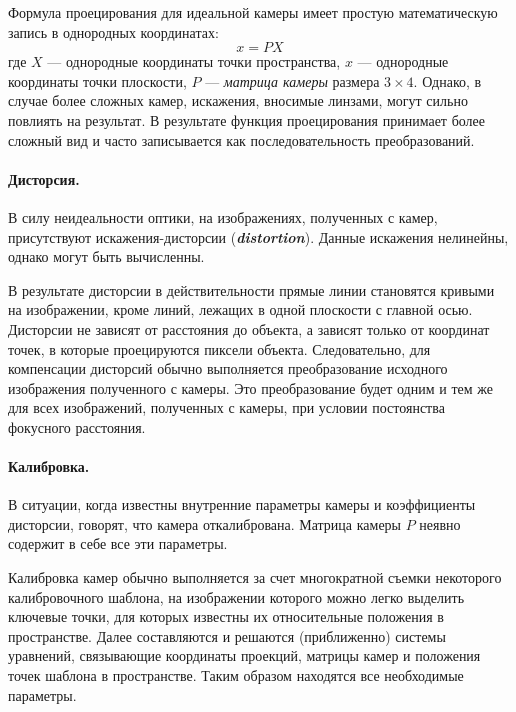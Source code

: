 \documentclass[oneside,final,12pt]{scrartcl}
\begin{document}
			Формула проецирования для идеальной камеры имеет простую математическую запись в однородных координатах:
			\[x = P X\]
			где \(X\) — однородные координаты точки пространства, \(x\) — однородные координаты точки плоскости, \(P\) — \textit{матрица камеры} размера \(3 \times 4\).
			Однако, в случае более сложных камер, искажения, вносимые линзами, могут сильно повлиять на результат. В результате функция проецирования принимает более сложный вид и часто записывается как последовательность преобразований.

			\paragraph{Дисторсия.} В силу неидеальности оптики, на изображениях, полученных с камер, присутствуют искажения-дисторсии (\textit{\textbf{distortion}}). Данные искажения нелинейны, однако могут быть вычисленны.

			В результате дисторсии в действительности прямые линии становятся кривыми на изображении, кроме линий, лежащих в одной плоскости с главной осью. Дисторсии не зависят от расстояния до объекта, а зависят только от координат точек, в которые проецируются пиксели объекта. Следовательно, для компенсации дисторсий обычно выполняется преобразование исходного изображения полученного с камеры. Это преобразование будет одним и тем же для всех изображений, полученных с камеры, при условии постоянства фокусного расстояния.

			\paragraph{Калибровка.} В ситуации, когда известны внутренние параметры камеры и коэффициенты дисторсии, говорят, что камера откалибрована. Матрица камеры \(P\) неявно содержит в себе все эти параметры.

			Калибровка камер обычно выполняется за счет многократной съемки некоторого калибровочного шаблона, на изображении которого можно легко выделить ключевые точки, для которых известны их относительные положения в пространстве. Далее составляются и решаются (приближенно) системы уравнений, связывающие координаты проекций, матрицы камер и положения точек шаблона в пространстве. Таким образом находятся все необходимые параметры.
\end{document}
